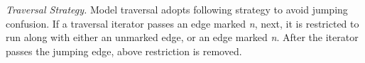 \textit{Traversal Strategy.} 
Model traversal adopts following strategy to avoid jumping confusion. If a traversal iterator passes an edge marked \textit{n}, next, it is restricted to run along with either an unmarked edge, or an edge marked \textit{n}. After the iterator passes the jumping edge, above restriction is removed.









  






